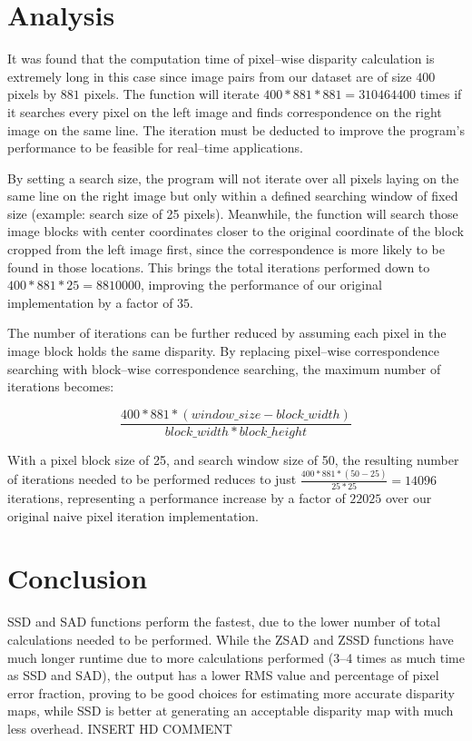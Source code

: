 \documentclass[conference]{IEEEtran}
\begin{document}
\section{Analysis}

It was found that the computation time of pixel--wise disparity calculation is extremely long in this case since image pairs from our dataset are of size $400$ pixels by $881$ pixels. The function will iterate $400*881*881=310464400$ times if it searches every pixel on the left image and finds correspondence on the right image on the same line. The iteration must be deducted to improve the program's performance to be feasible for real--time applications.

By setting a search size, the program will not iterate over all pixels laying on the same line on the right image but only within a defined searching window of fixed size (example: search size of 25 pixels). Meanwhile, the function will search those image blocks with center coordinates closer to the original coordinate of the block cropped from the left image first, since the correspondence is more likely to be found in those locations. This brings the total iterations performed down to $400*881*25=8810000$, improving the performance of our original implementation by a factor of $35$.

The number of iterations can be further reduced by assuming each pixel in the image block holds the same disparity. By replacing pixel--wise correspondence searching with block--wise correspondence searching, the maximum number of iterations becomes:

\begin{equation*}
    \frac{400*881*(window\_size-block\_width)}{block\_width*block\_height}
\end{equation*}

With a pixel block size of 25, and search window size of 50, the resulting number of iterations needed to be performed reduces to just $\frac{400*881*(50-25)}{25*25}=14096$ iterations, representing a performance increase by a factor of $22025$ over our original naive pixel iteration implementation.

\vspace{4pt}
\section{Conclusion}

SSD and SAD functions perform the fastest, due to the lower number of total calculations needed to be performed. While the ZSAD and ZSSD functions have much longer runtime due to more calculations performed (3--4 times as much time as SSD and SAD), the output has a lower RMS value and percentage of pixel error fraction, proving to be good choices for estimating more accurate disparity maps, while SSD is better at generating an acceptable disparity map with much less overhead. INSERT HD COMMENT
\end{document}
